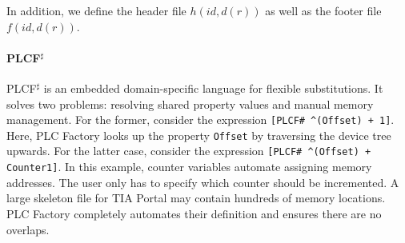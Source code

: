 \documentclass[portrait,final,a0paper,fontscale=0.277]{baposter}
\begin{document}
\begin{poster}
{\begin{multicols}{2}
\columnbreak

\noindent
In addition, we define the header file $h(\mathit{id}, d(r))$ as well as the footer file $f(\mathit{id}, d(r))$.

\vspace{5mm}

\begin{minipage}[t]{0.8\linewidth}
   \vspace{-2ex}
 \label{alg:algo}
\end{minipage}


\paragraph{PLCF$^\sharp$}
\noindent
PLCF$^\sharp$ is an embedded domain-specific language for flexible substitutions. It solves two problems: resolving shared property values and manual memory management. For the former, consider the expression \texttt{[PLCF\# \textasciicircum(Offset) + 1]}. Here, PLC Factory looks up the property \texttt{Offset} by traversing the device tree upwards. For the latter case, consider the expression \texttt{[PLCF\# \textasciicircum(Offset) + Counter1]}. In this example, counter variables automate assigning memory addresses. The user only has to specify which counter should be incremented. A large skeleton file for TIA Portal may contain hundreds of memory locations. PLC Factory completely automates their definition and ensures there are no overlaps.


\end{multicols}}
\end{poster}
\end{document}
